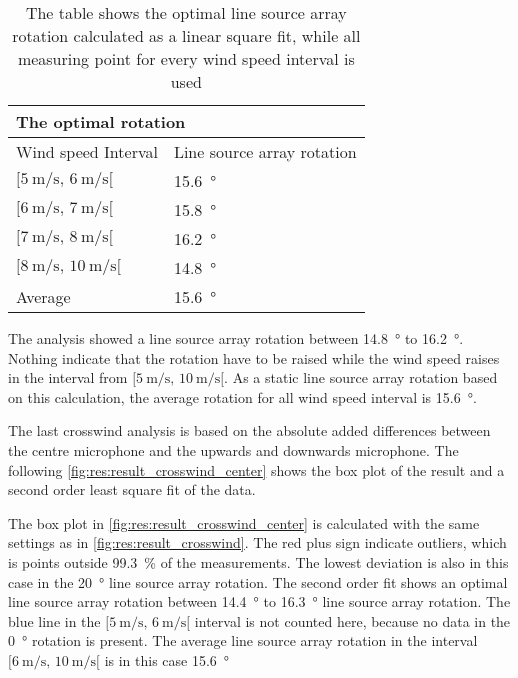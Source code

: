  
 \begin{table}[H]
 \centering
 \caption{The table shows the optimal line source array rotation calculated as a linear square fit, while all measuring point for every wind speed interval is used}
\begin{tabular}{l|l}
\multicolumn{2}{l}{The optimal rotation}      \\ \hline
Wind speed Interval & Line source array rotation \\ \hline
  $[\SI{5}{\meter\per\second},\, \SI{6}{\meter\per\second}[ $       &   \SI{15.6}{\degree}    \\
   $[\SI{6}{\meter\per\second},\, \SI{7}{\meter\per\second}[ $     &   \SI{15.8}{\degree}     \\
  $[\SI{7}{\meter\per\second},\, \SI{8}{\meter\per\second}[ $       &    \SI{16.2}{\degree}    \\
   $[\SI{8}{\meter\per\second},\, \SI{10}{\meter\per\second}[ $      &     \SI{14.8}{\degree}  \\ \hline
    Average      &     \SI{15.6}{\degree} 
\end{tabular}
\label{res:tab:cross_mean_all}
\end{table}     

The analysis showed a line source array rotation between \SI{14.8}{\degree} to  \SI{16.2}{\degree}. Nothing indicate that the rotation have to be raised while the wind speed raises in the interval from $[\SI{5}{\meter\per\second},\, \SI{10}{\meter\per\second}[ $. As a static line source array rotation based on this calculation, the average rotation for all wind speed interval is \SI{15.6}{\degree}.

The last crosswind analysis is based on the absolute added differences between the centre microphone and the upwards and downwards microphone. The following \autoref{fig:res:result_crosswind_center} shows the box plot of the result and a second order least square fit of the data. 
 

The box plot in \autoref{fig:res:result_crosswind_center} is calculated with the same settings as in  \autoref{fig:res:result_crosswind}. The red plus sign indicate outliers, which is points outside \SI{99.3}{\percent} of the measurements. The lowest deviation is also in this case in the \SI{20}{\degree} line source array rotation. The second order fit shows an optimal line source array rotation between \SI{14.4}{\degree} to \SI{16.3}{\degree} line source array rotation. The blue line in the $[\SI{5}{\meter\per\second},\, \SI{6}{\meter\per\second}[ $ interval is not counted here, because no data in the \SI{0}{\degree} rotation is present. The average line source array rotation in the interval $[\SI{6}{\meter\per\second},\, \SI{10}{\meter\per\second}[ $ is in this case \SI{15.6}{\degree}
  
